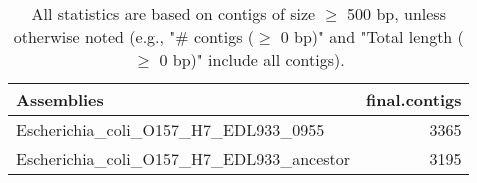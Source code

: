 \documentclass[12pt,a4paper]{article}
\begin{document}
\begin{table}[ht]
\begin{center}
\caption{All statistics are based on contigs of size $\geq$ 500 bp, unless otherwise noted (e.g., "\# contigs ($\geq$ 0 bp)" and "Total length ($\geq$ 0 bp)" include all contigs).}
\begin{tabular}{|l*{1}{|r}|}
\hline
Assemblies & final.contigs \\ \hline
Escherichia\_coli\_O157\_H7\_EDL933\_0955 & 3365 \\ \hline
Escherichia\_coli\_O157\_H7\_EDL933\_ancestor & 3195 \\ \hline
\end{tabular}
\end{center}
\end{table}
\end{document}
